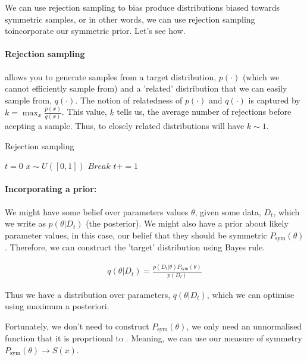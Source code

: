 We can use rejection sampling to bias produce distributions biased towards symmetric
samples, or in other words, we can use rejection sampling toincorporate our symmetric prior. Let's see how.

\paragraph{Rejection sampling} allows you to generate samples from a target distribution, $p(\cdot)$ (which we cannot efficiently sample from) and a 'related' distribution that we can easily sample from, $q(\cdot)$.
The notion of relatedness of $p(\cdot)$ and $q(\cdot)$ is captured by $k = \mathop{\text{max}}_x \frac{p(x)}{q(x)}$.
This value, $k$ tells us, the average number of rejections before acepting a sample.
Thus, to closely related distributions will have $k\sim 1$. \cite{W.R.1992, Owen2013}

\begin{algorithm}
	\caption{Rejection sampling}
	\begin{algorithmic}[1]

		\State $t=0$
			\State $x\sim U([0, 1])$
				\State $Break$
			\EndIf
			\State $t += 1$
		\EndWhile
		\State {}
		\EndProcedure

	\end{algorithmic}
\end{algorithm}

\paragraph{Incorporating a prior:} We might have some belief over parameters values $\theta$, given some data, $D_t$, which we write as $p(\theta| D_t)$ (the posterior).
We might also have a prior about likely parameter values, in this case, our belief that they should be symmetric $P_{\text{sym}}(\theta)$. Therefore, we can construct the 'target' distribution using Bayes rule.

\begin{align*}
q(\theta | D_t) = \frac{p(D_t | \theta)P_{\text{sym}}(\theta)}{p(D_t)}
\end{align*}

Thus we have a distribution over parameters, $q(\theta | D_t)$, which we can optimise using maximum a posteriori.

Fortunately, we don't need to construct $P_{\text{sym}}(\theta)$, we only need an unnormalised function that it is proprtional to \cite{Owen2013}. Meaning, we can use our measure of symmetry $P_{\text{sym}}(\theta)\to S(x)$.

